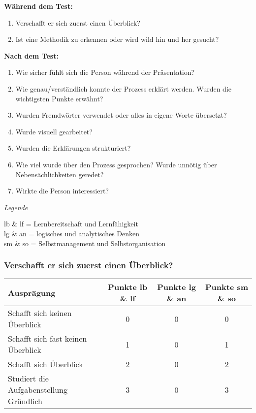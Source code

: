 \textbf{Während dem Test:}
\begin{enumerate}
\item Verschafft er sich zuerst einen Überblick?
\item Ist eine Methodik zu erkennen oder wird wild hin und her gesucht?
\end{enumerate}

\textbf{Nach dem Test:}
\begin{enumerate}
\item Wie sicher fühlt sich die Person während der Präsentation?
\item Wie genau/verständlich konnte der Prozess erklärt werden. Wurden die wichtigsten Punkte erwähnt?
\item Wurden Fremdwörter verwendet oder alles in eigene Worte übersetzt?
\item Wurde visuell gearbeitet?
\item Wurden die Erklärungen strukturiert?
\item Wie viel wurde über den Prozess gesprochen? Wurde unnötig über Nebensächlichkeiten geredet?
\item Wirkte die Person interessiert?
\end{enumerate}
\vspace{3mm}

\textit{Legende}

lb \& lf = Lernbereitschaft und Lernfähigkeit\\
lg \& an = logisches und analytisches Denken \\
sm \& so = Selbstmanagement und Selbstorganisation

\subsubsection{Verschafft er sich zuerst einen Überblick?}
\begin{tabular}{| l | c | c | c |}
  \hline	
  \textbf{Ausprägung} & \textbf{Punkte lb \& lf} & \textbf{Punkte lg \& an} & \textbf{Punkte sm \& so} \\
  \hline  		
  Schafft sich keinen Überblick & 0  & 0 & 0 \\ 
  \hline
  Schafft sich fast keinen Überblick & 1 & 0 & 1 \\ 
  \hline
  Schafft sich Überblick & 2 & 0 & 2 \\
  \hline  
  Studiert die Aufgabenstellung Gründlich & 3 & 0 &  3 \\
  \hline  
\end{tabular}
  
